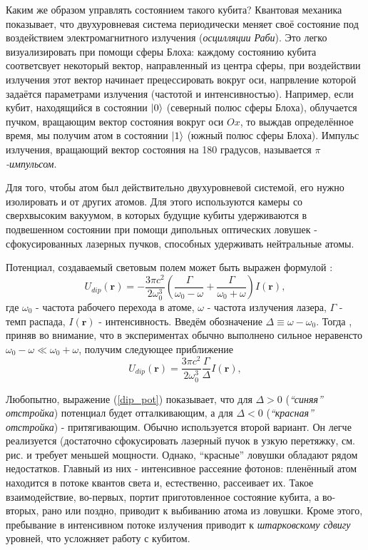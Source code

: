 \documentclass[12pt]{article}
\begin{document}
    Каким же образом управлять состоянием такого кубита? Квантовая механика
    показывает, что двухуровневая система периодически меняет своё состояние
    под воздействием электромагнитного излучения (\textit{осцилляции Раби}).
    Это легко визуализировать при помощи сферы Блоха: каждому состоянию
    кубита соответсвует некоторый вектор, направленный из центра сферы, при
    воздействии излучения этот вектор начинает прецессировать вокруг оси,
    напрвление которой задаётся параметрами излучения (частотой и интенсивностью).
    Например, если кубит, находящийся в состоянии $\ket{0}$ (северный полюс сферы Блоха),
    облучается пучком, вращающим вектор состояния вокруг оси $Ox$, то выждав определённое
    время, мы получим атом в состоянии $\ket{1}$ (южный полюс сферы Блоха). Импульс излучения,
    вращающий вектор состояния на 180 градусов, называется
    \textit{$\pi$-импульсом}.
    
    Для того, чтобы атом был действительно двухуровневой системой, его нужно
    изолировать и от других атомов. Для этого используются камеры со сверхвысоким
    вакуумом, в которых будущие кубиты удерживаются в подвешенном состоянии при
    помощи дипольных оптических ловушек - сфокусированных лазерных пучков,
    способных удерживать нейтральные атомы.

    Потенциал, создаваемый световым полем может быть выражен формулой
    \cite{grimm2000optical}:
    \begin{equation}
        U_{dip}(\textbf{r}) = -\frac{3\pi c^2}{2\omega_0^3}
            \left(\frac{\Gamma}{\omega_0 - \omega} +
                  \frac{\Gamma}{\omega_0 + \omega}\right)I(\textbf{r}),
        \label{dip_potential}
    \end{equation}
    где $\omega_0$ - частота рабочего перехода в атоме, $\omega$ - частота
    излучения лазера, $\Gamma$ - темп распада, $I(\textbf{r})$ - интенсивность.
    Введём обозначение $\Delta \equiv \omega - \omega_0$. Тогда , приняв во внимание,
    что в экспериментах обычно выполнено сильное неравенсто
    $\omega_0 - \omega \ll \omega_0 + \omega$, получим следующее приближение
    \begin{equation}
        U_{dip}(\textbf{r}) = \frac{3\pi c^2}{2\omega_0^3}
            \frac{\Gamma}{\Delta}I(\textbf{r}),
        \label{dip_pot}
    \end{equation}


    Любопытно, выражение (\ref{dip_pot}) показывает, что для $\Delta > 0$
    (\textit{\enquote{синяя} отстройка}) потенциал будет отталкивающим, а для
    $\Delta < 0$ (\textit{\enquote{красная} отстройка}) - притягивающим.
    Обычно используется второй вариант. Он легче реализуется (достаточно
    сфокусировать лазерный пучок в узкую перетяжку, см. рис. 
    и требует меньшей мощности. Однако, \enquote{красные} ловушки обладают рядом
    недостатков. Главный из них - интенсивное рассеяние фотонов: пленённый атом
    находится в потоке квантов света и, естественно, рассеивает их. Такое
    взаимодействие, во-первых, портит приготовленное состояние кубита,
    а во-вторых, рано или поздно, приводит к выбиванию атома из ловушки.
    Кроме этого, пребывание в интенсивном  потоке излучения приводит к
    \textit{штарковскому сдвигу} уровней, что усложняет работу с кубитом.
\end{document}
